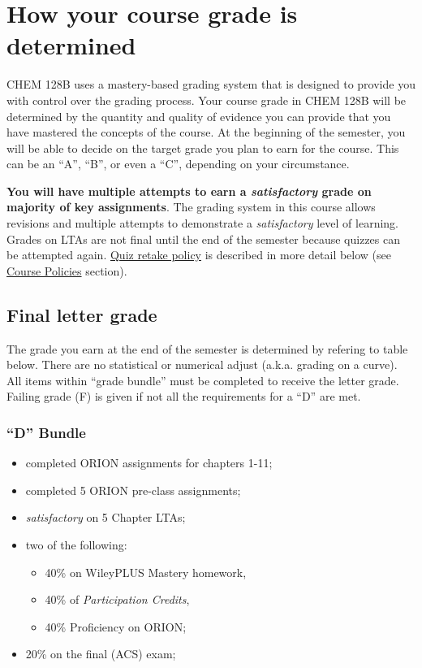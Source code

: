 \hypertarget{how-your-course-grade-is-determined}{%
\section{How your course grade is
determined}\label{how-your-course-grade-is-determined}}

CHEM 128B uses a mastery-based grading system that is designed to
provide you with control over the grading process. Your course grade in
CHEM 128B will be determined by the quantity and quality of evidence you
can provide that you have mastered the concepts of the course. At the
beginning of the semester, you will be able to decide on the target
grade you plan to earn for the course. This can be an ``A'', ``B'', or
even a ``C'', depending on your circumstance.

\textbf{You will have multiple attempts to earn a \emph{satisfactory}
grade on majority of key assignments}. The grading system in this course
allows revisions and multiple attempts to demonstrate a
\emph{satisfactory} level of learning. Grades on LTAs are not ﬁnal until
the end of the semester because quizzes can be attempted again.
\protect\hyperlink{revisions}{Quiz retake policy} is described in more
detail below (see \protect\hyperlink{course-policies}{Course Policies}
section).

\hypertarget{final-letter-grade}{%
\subsection{Final letter grade}\label{final-letter-grade}}

The grade you earn at the end of the semester is determined by refering
to table below. There are no statistical or numerical adjust (a.k.a.
grading on a curve). All items within ``grade bundle'' must be completed
to receive the letter grade. Failing grade (F) is given if not all the
requirements for a ``D'' are met.

\hypertarget{d-bundle}{%
\subsubsection{``D'' Bundle}\label{d-bundle}}

\begin{itemize}
\item
  completed ORION assignments for chapters 1-11;
\item
  completed 5 ORION pre-class assignments;
\item
  \emph{satisfactory} on 5 Chapter LTAs;
\item
  two of the following:

  \begin{itemize}
  \tightlist
  \item
    40\% on WileyPLUS Mastery homework,
  \item
    40\% of \emph{Participation Credits},
  \item
    40\% Proficiency on ORION;
  \end{itemize}
\item
  20\% on the final (ACS) exam;
\end{itemize}


